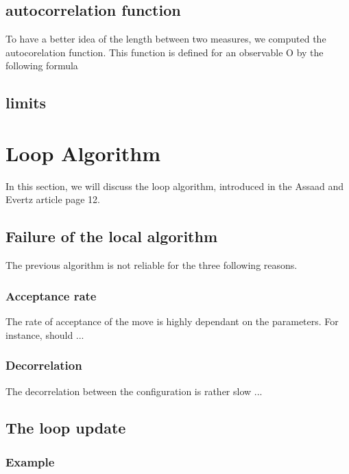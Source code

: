 \documentclass[a4paper,12pt,twoside]{article}
\begin{document}
		 
		 \subsection{autocorrelation function}
		 To have a better idea of the length between two measures, we computed the autocorelation function. This function is defined for an observable O by the following formula
		 



	
	\subsection{limits}



	\section{Loop Algorithm}
	In this section, we will discuss the loop algorithm, introduced in the Assaad and Evertz article page 12. 
	
	\subsection{Failure of the local algorithm}
	The previous algorithm is not reliable for the three following reasons.
	


	\subsubsection{Acceptance rate} The rate of acceptance of the move is highly dependant on the parameters. For instance, should ...
	
	\subsubsection{Decorrelation} The decorrelation between the configuration is rather slow ...

	\subsection{The loop update}
	
	\subsubsection{Example}
	
\end{document}
